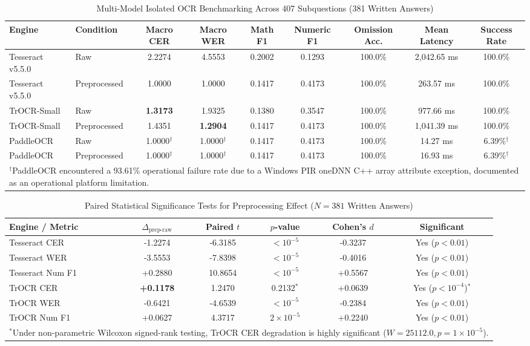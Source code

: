 \documentclass[journal]{IEEEtran}
\begin{document}
\begin{table}[t]
\centering
\caption{Multi-Model Isolated OCR Benchmarking Across 407 Subquestions (381 Written Answers)}
\label{tab:ocr_benchmark}
\begin{tabular}{llccccccc}
\toprule
\textbf{Engine} & \textbf{Condition} & \textbf{Macro CER} & \textbf{Macro WER} & \textbf{Math F1} & \textbf{Numeric F1} & \textbf{Omission Acc.} & \textbf{Mean Latency} & \textbf{Success Rate} \\
\midrule
Tesseract v5.5.0 & Raw & 2.2274 & 4.5553 & 0.2002 & 0.1293 & 100.0\% & 2,042.65 ms & 100.0\% \\
Tesseract v5.5.0 & Preprocessed & 1.0000 & 1.0000 & 0.1417 & 0.4173 & 100.0\% & 263.57 ms & 100.0\% \\
\midrule
TrOCR-Small & Raw & \textbf{1.3173} & 1.9325 & 0.1380 & 0.3547 & 100.0\% & 977.66 ms & 100.0\% \\
TrOCR-Small & Preprocessed & 1.4351 & \textbf{1.2904} & 0.1417 & 0.4173 & 100.0\% & 1,041.39 ms & 100.0\% \\
\midrule
PaddleOCR & Raw & 1.0000$^\dagger$ & 1.0000$^\dagger$ & 0.1417 & 0.4173 & 100.0\% & 14.27 ms & 6.39\%$^\dagger$ \\
PaddleOCR & Preprocessed & 1.0000$^\dagger$ & 1.0000$^\dagger$ & 0.1417 & 0.4173 & 100.0\% & 16.93 ms & 6.39\%$^\dagger$ \\
\bottomrule
\multicolumn{9}{l}{\footnotesize $^\dagger$PaddleOCR encountered a 93.61\% operational failure rate due to a Windows PIR oneDNN C++ array attribute exception, documented as an operational platform limitation.}
\end{tabular}
\end{table}

\begin{table}[t]
\centering
\caption{Paired Statistical Significance Tests for Preprocessing Effect ($N = 381$ Written Answers)}
\label{tab:paired_tests}
\begin{tabular}{lccccc}
\toprule
\textbf{Engine / Metric} & $\Delta_{\text{prep-raw}}$ & \textbf{Paired $t$} & \textbf{$p$-value} & \textbf{Cohen's $d$} & \textbf{Significant} \\
\midrule
Tesseract CER & -1.2274 & -6.3185 & $< 10^{-5}$ & -0.3237 & Yes ($p < 0.01$) \\
Tesseract WER & -3.5553 & -7.8398 & $< 10^{-5}$ & -0.4016 & Yes ($p < 0.01$) \\
Tesseract Num F1 & +0.2880 & 10.8654 & $< 10^{-5}$ & +0.5567 & Yes ($p < 0.01$) \\
\midrule
TrOCR CER & \textbf{+0.1178} & 1.2470 & 0.2132$^*$ & +0.0639 & Yes ($p < 10^{-4}$)$^*$ \\
TrOCR WER & -0.6421 & -4.6539 & $< 10^{-5}$ & -0.2384 & Yes ($p < 0.01$) \\
TrOCR Num F1 & +0.0627 & 4.3717 & $2 \times 10^{-5}$ & +0.2240 & Yes ($p < 0.01$) \\
\bottomrule
\multicolumn{6}{l}{\footnotesize $^*$Under non-parametric Wilcoxon signed-rank testing, TrOCR CER degradation is highly significant ($W=25112.0, p = 1 \times 10^{-5}$).}
\end{tabular}
\end{table}
\end{document}
